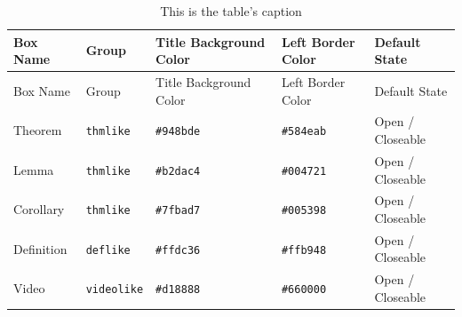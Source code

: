 \documentclass[
  a4paper,
  DIV=11,
  numbers=noendperiod,
  oneside]{scrreport}
\begin{document}
\begin{longtable}[]{@{}
  >{\raggedright\arraybackslash}p{}
  >{\raggedright\arraybackslash}p{}
  >{\raggedright\arraybackslash}p{}
  >{\raggedright\arraybackslash}p{}
  >{\raggedright\arraybackslash}p{}@{}}
\caption{This is the table's caption}\label{tbl-boxcols}\tabularnewline
\toprule\noalign{}
\begin{minipage}[b]{\linewidth}\raggedright
Box Name
\end{minipage} & \begin{minipage}[b]{\linewidth}\raggedright
Group
\end{minipage} & \begin{minipage}[b]{\linewidth}\raggedright
Title Background Color
\end{minipage} & \begin{minipage}[b]{\linewidth}\raggedright
Left Border Color
\end{minipage} & \begin{minipage}[b]{\linewidth}\raggedright
Default State
\end{minipage} \\
\midrule\noalign{}
\endfirsthead
\toprule\noalign{}
\begin{minipage}[b]{\linewidth}\raggedright
Box Name
\end{minipage} & \begin{minipage}[b]{\linewidth}\raggedright
Group
\end{minipage} & \begin{minipage}[b]{\linewidth}\raggedright
Title Background Color
\end{minipage} & \begin{minipage}[b]{\linewidth}\raggedright
Left Border Color
\end{minipage} & \begin{minipage}[b]{\linewidth}\raggedright
Default State
\end{minipage} \\
\midrule\noalign{}
\endhead
\bottomrule\noalign{}
\endlastfoot
Theorem & \texttt{thmlike} & {}\texttt{\#948bde} & {}\texttt{\#584eab} &
Open / Closeable \\
Lemma & \texttt{thmlike} & {}\texttt{\#b2dac4} & {}\texttt{\#004721} &
Open / Closeable \\
Corollary & \texttt{thmlike} & {}\texttt{\#7fbad7} & {}\texttt{\#005398}
& Open / Closeable \\
Definition & \texttt{deflike} & {}\texttt{\#ffdc36} &
{}\texttt{\#ffb948} & Open / Closeable \\
Video & \texttt{videolike} & {}\texttt{\#d18888} & {}\texttt{\#660000} &
Open / Closeable \\
\end{longtable}
\end{document}
